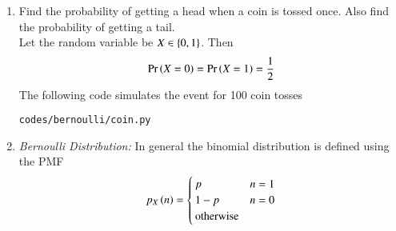 \renewcommand{\theequation}{\theenumi}
\renewcommand{\thefigure}{\theenumi}
\begin{enumerate}[label=\thesubsection.\arabic*.,ref=\thesubsection.\theenumi]
%
\item Find the probability of getting a head when a coin is tossed once. Also
find the probability of getting a tail.
\\
\solution  
Let the random variable be $X\in \left\{0,1\right\}$.  Then
\begin{align}
\Pr\left(X=0\right)=\Pr\left(X=1\right)=\frac{1}{2}
\end{align}
The following code simulates the event for 100 coin tosses
\begin{lstlisting}
codes/bernoulli/coin.py
\end{lstlisting}
\item {\em Bernoulli Distribution: }  In general the binomial distribution is defined using the PMF
\begin{align}
p_{X}\left(n\right) 
= 
\begin{cases}
p & n = 1
\\
1-p & n = 0
\\
\text{otherwise}
\end{cases}
\end{align}


\end{enumerate}

